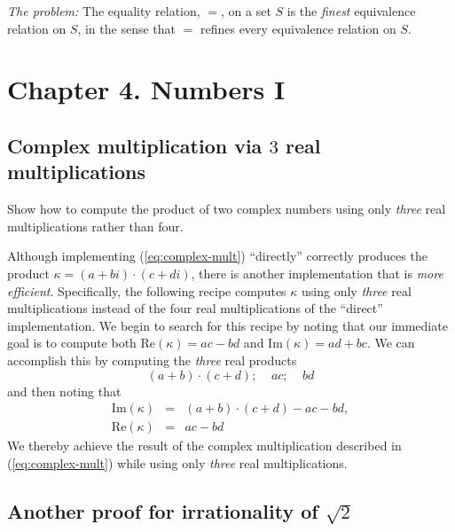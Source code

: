 \noindent \textit{The problem:}
The equality relation, $=$, on a set $S$ is the {\em finest}
equivalence relation on $S$, in the sense that $=$ refines every
equivalence relation on $S$.


\section{Chapter 4. Numbers I}

\subsection{Complex
  multiplication via $3$ real multiplications}

Show how to compute the product of two complex numbers using only {\em three}
real multiplications rather than four.
\medskip

Although implementing (\ref{eq:complex-mult}) ``directly'' correctly
produces the product $\kappa = (a+bi) \cdot (c+di)$, there is another
implementation that is {\em more efficient}.  Specifically, the
following recipe computes $\kappa$ using only {\em three} real
multiplications instead of the four real multiplications of the
``direct'' implementation.  We begin to search for this recipe by
noting that our immediate goal is to compute both Re$(\kappa) = ac-bd$
and Im$(\kappa) = ad+bc$.  We can accomplish this by computing the
{\em three} real products
\begin{equation}
\label{eq:complex-mult-3a}
(a+b) \cdot (c+d); \ \ \ \ \
ac;  \ \ \ \ \ bd
\end{equation}
and then noting that
\begin{equation}
\label{eq:complex-mult-3b}
\begin{array}{lcl}
\mbox{Im}(\kappa) & = & (a+b) \cdot (c+d) - ac -bd, \\
\mbox{Re}(\kappa) & = & ac -bd
\end{array}
\end{equation}
We thereby achieve the result of the complex multiplication described
in (\ref{eq:complex-mult}) while using only {\em three} real
multiplications.


\subsection{Another proof for irrationality of $\sqrt{2}$}


